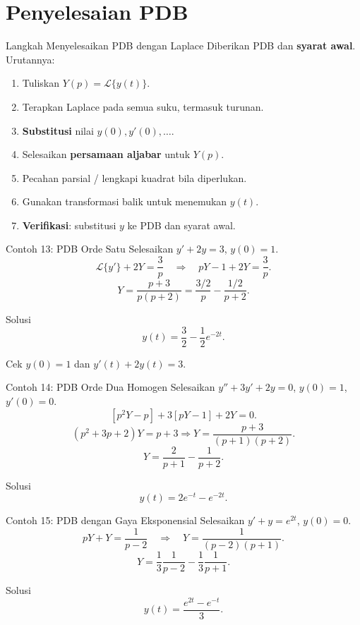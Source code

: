 \documentclass[aspectratio=169,11pt]{beamer}
\newcommand{\Lap}{\mathcal{L}}
\begin{document}
\section{Penyelesaian PDB}
\begin{frame}{Langkah Menyelesaikan PDB dengan Laplace}
Diberikan PDB dan \textbf{syarat awal}. Urutannya:
\begin{enumerate}
\item Tuliskan $Y(p)=\Lap\{y(t)\}$.
\item Terapkan Laplace pada semua suku, termasuk turunan.
\item \textbf{Substitusi} nilai $y(0),y'(0),\ldots$.
\item Selesaikan \textbf{persamaan aljabar} untuk $Y(p)$.
\item Pecahan parsial / lengkapi kuadrat bila diperlukan.
\item Gunakan transformasi balik untuk menemukan $y(t)$.
\item \textbf{Verifikasi}: substitusi $y$ ke PDB dan syarat awal.
\end{enumerate}
\end{frame}

\begin{frame}{Contoh 13: PDB Orde Satu}
Selesaikan $y'+2y=3$, $y(0)=1$.
\[
\Lap\{y'\}+2Y=\frac3p
\quad\Rightarrow\quad pY-1+2Y=\frac3p.
\]
\[
Y=\frac{p+3}{p(p+2)}
=\frac{3/2}{p}-\frac{1/2}{p+2}.
\]
\begin{exampleblock}{Solusi}
\[
\boxed{y(t)=\frac32-\frac12e^{-2t}}.
\]
\end{exampleblock}
\small Cek $y(0)=1$ dan $y'(t)+2y(t)=3$.
\end{frame}

\begin{frame}{Contoh 14: PDB Orde Dua Homogen}
Selesaikan $y''+3y'+2y=0$, $y(0)=1$, $y'(0)=0$.
\[
[p^2Y-p]+3[pY-1]+2Y=0.
\]
\[
(p^2+3p+2)Y=p+3
\Rightarrow Y=\frac{p+3}{(p+1)(p+2)}.
\]
\[
Y=\frac2{p+1}-\frac1{p+2}.
\]
\begin{exampleblock}{Solusi}
\[
\boxed{y(t)=2e^{-t}-e^{-2t}}.
\]
\end{exampleblock}
\end{frame}

\begin{frame}{Contoh 15: PDB dengan Gaya Eksponensial}
Selesaikan $y'+y=e^{2t}$, $y(0)=0$.
\[
pY+Y=\frac1{p-2}
\quad\Rightarrow\quad
Y=\frac1{(p-2)(p+1)}.
\]
\[
Y=\frac13\frac1{p-2}-\frac13\frac1{p+1}.
\]
\begin{exampleblock}{Solusi}
\[
\boxed{y(t)=\frac{e^{2t}-e^{-t}}3}.
\]
\end{exampleblock}
\end{frame}
\end{document}
